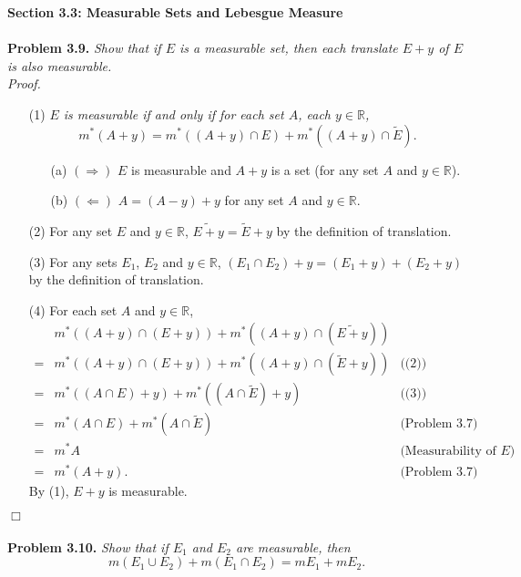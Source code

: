\documentclass{article}
\begin{document}
\textbf{\large Section 3.3: Measurable Sets and Lebesgue Measure} \\\\



\textbf{Problem 3.9.}
\emph{Show that if $E$ is a measurable set, then each translate $E+y$ of $E$
is also measurable.} \\

\emph{Proof.}
\begin{enumerate}
\item[(1)]
\emph{$E$ is measurable if and only if
for each set $A$, each $y \in \mathbb{R}$,
$$m^{*}(A+y)
= m^{*}((A+y) \cap E) + m^{*}((A+y) \cap \widetilde{E}).$$}
  \begin{enumerate}
  \item[(a)]
  $(\Longrightarrow)$
  $E$ is measurable and
  $A+y$ is a set (for any set $A$ and $y \in \mathbb{R}$).
  \item[(b)]
  $(\Longleftarrow)$
  $A = (A-y) + y$ for any set $A$ and $y \in \mathbb{R}$.
  \end{enumerate}
\item[(2)]
For any set $E$ and $y \in \mathbb{R}$,
$\widetilde{E+y} = \widetilde{E}+y$ by the definition of translation.
\item[(3)]
For any sets $E_1$, $E_2$ and $y \in \mathbb{R}$,
$(E_1 \cap E_2)+y = (E_1+y) + (E_2+y)$ by the definition of translation.
\item[(4)]
For each set $A$ and $y \in \mathbb{R}$,
\begin{align*}
 & m^{*}((A+y) \cap (E+y)) + m^{*}((A+y) \cap (\widetilde{E+y}))
  & \\
=& m^{*}((A+y) \cap (E+y)) + m^{*}((A+y) \cap (\widetilde{E}+y))
  &\text{((2))} \\
=& m^{*}((A \cap E)+y) + m^{*}((A \cap \widetilde{E})+y)
  &\text{((3))} \\
=& m^{*}(A \cap E) + m^{*}(A \cap \widetilde{E})
  &\text{(Problem 3.7)} \\
=& m^{*}A
  &\text{(Measurability of $E$)} \\
=& m^{*}(A+y).
  &\text{(Problem 3.7)}
\end{align*}
By (1), $E+y$ is measurable.
\end{enumerate}
$\Box$ \\\\



\textbf{Problem 3.10.}
\emph{Show that if $E_1$ and $E_2$ are measurable, then
$$m(E_1 \cup E_2) + m(E_1 \cap E_2) = mE_1 + mE_2.$$}
\end{document}
